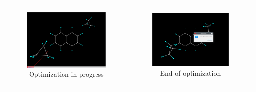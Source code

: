 \documentclass[10pt]{article}
\begin{document}
\begin{enumerate}
\begin{center}
\begin{tabular}{cc}
\begin{minipage}{.48\linewidth}
\begin{figure}[H]
\begin{center}
\includegraphics[width=.8\linewidth]{damqt320_epic_3_b.png}
\end{center}
\caption{{Optimization in progress} \label{fig:A6_3}}
\end{figure}
\end{minipage}
&
\begin{minipage}{.48\linewidth}
\begin{figure}[H]
\begin{center}
\includegraphics[width=.8\linewidth]{damqt320_epic_4.png}
\end{center}
\caption{{End of optimization}\label{fig:A6_4}}
\end{figure}
\end{minipage}
\end{tabular}
\end{center}



\end{enumerate}
\end{document}
